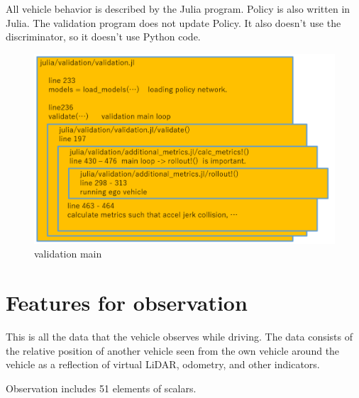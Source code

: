 All vehicle behavior is described by the Julia program. 
Policy is also written in Julia.
The validation program does not update Policy. It also doesn't use the discriminator, so it doesn't use Python code.

\begin{figure}[H]
\begin{center}
\includegraphics[width=14cm]{./figures/validation_main.png}
\caption{validation main}
\label{fig:validationa_main}
\end{center}
\end{figure}


\section{Features for observation}

This is all the data that the vehicle observes while driving. The data consists of the relative position of another vehicle seen from the own vehicle around the vehicle as a reflection of virtual LiDAR, odometry, and other indicators.

Observation includes 51 elements of scalars.

